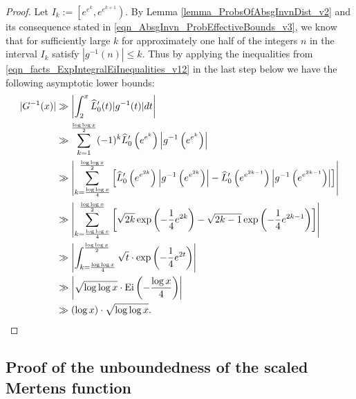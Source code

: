 \documentclass[11pt,reqno,a4letter]{article}
\numberwithin{figure}{section}
\numberwithin{table}{section}
\theoremstyle{plain}
\numberwithin{theorem}{section}
\theoremstyle{definition}
\begin{document}
\begin{proof}
Let $I_k := \left[e^{e^{k}}, e^{e^{k+1}}\right)$. 
By Lemma \ref{lemma_ProbsOfAbsgInvnDist_v2} and its consequence stated in 
\eqref{eqn_AbsgInvn_ProbEffectiveBounds_v3}, we know that for sufficiently large $k$ 
for approximately one half of the integers $n$ in the interval $I_k$ satisfy 
$|g^{-1}(n)| \leq k$. Thus by applying the inequalities from 
\eqref{eqn_facts_ExpIntegralEiInequalities_v12} in the last step below 
we have the following asymptotic lower bounds: 
\begin{align*} 
\notag 
|G^{-1}(x)| & \gg \left\lvert \int_2^x \widehat{L}_0^{\prime}(t) |g^{-1}(t)| dt \right\rvert \\ 
     & \gg \sum_{k=1}^{\frac{\log\log x}{2}} 
     (-1)^{k} \widehat{L}_0^{\prime}\left(e^{e^{k}}\right) 
     \left\lvert g^{-1}\left(e^{e^{k}}\right) \right\rvert \\ 
     & \gg \left\lvert \sum_{k=\frac{\log\log x}{4}}^{\frac{\log\log x}{2}} \left[ 
     \widehat{L}_0^{\prime}\left(e^{e^{2k}}\right) \left\lvert g^{-1}\left(e^{e^{2k}}\right) \right\rvert - 
      \widehat{L}_0^{\prime}\left(e^{e^{2k-1}}\right) \left\lvert g^{-1}\left(e^{e^{2k-1}}\right) \right\rvert
     \right] 
     \right\rvert \\ 
     & \gg \left\lvert \sum_{k=\frac{\log\log x}{4}}^{\frac{\log\log x}{2}} \left[ 
     \sqrt{2k} \exp\left(-\frac{1}{4} e^{2k}\right) - 
     \sqrt{2k-1} \exp\left(-\frac{1}{4} e^{2k-1}\right) 
     \right] 
     \right\rvert \\ 
     & \gg \left\lvert \int_{k=\frac{\log\log x}{4}}^{\frac{\log\log x}{2}} 
     \sqrt{t} \cdot \exp\left(-\frac{1}{4} e^{2t}\right) 
     \right\rvert \\ 
     & \gg \left\lvert \sqrt{\log\log x} \cdot \operatorname{Ei}\left(-\frac{\log x}{4}\right) 
     \right\rvert \\ 
     & \gg (\log x) \cdot \sqrt{\log\log x}. 
     \qedhere 
\end{align*} 
\end{proof} 

\subsection{Proof of the unboundedness of the scaled Mertens function}
\label{subSection_TheCoreResultProof} 
\end{document}
